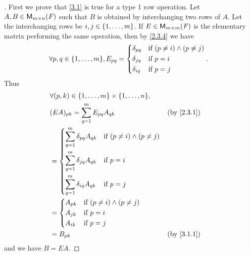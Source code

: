 \begin{proof}[]
	First we prove that \cref{3.1} is true for a type 1 row operation.
	Let \(A, B \in \ms\) such that \(B\) is obtained by interchanging two rows of \(A\).
	Let the interchanging rows be \(i, j \in \left\lbrace1, \dots, m\right\rbrace\).
	If \(E \in \ms[m][m][\F]\) is the elementary matrix performing the same operation, then by \cref{2.3.4} we have
	\[
		\forall p, q \in \set{1, \dots, m}, E_{p q} = \begin{dcases}
			\delta_{p q} & \text{if } (p \neq i) \land (p \neq j) \\
			\delta_{j q} & \text{if } p = i                       \\
			\delta_{i q} & \text{if } p = j
		\end{dcases}.
	\]
	Thus
	\begin{align*}
		 & \forall (p, k) \in \set{1, \dots, m} \times \set{1, \dots, n},                                  \\
		 & (EA)_{p k} = \sum_{q = 1}^m E_{p q} A_{q k}                                     &  & \by{2.3.1} \\
		 & = \begin{dcases}
			     \sum_{q = 1}^m \delta_{p q} A_{q k} & \text{if } (p \neq i) \land (p \neq j) \\
			     \sum_{q = 1}^m \delta_{j q} A_{q k} & \text{if } p = i                       \\
			     \sum_{q = 1}^m \delta_{i q} A_{q k} & \text{if } p = j
		     \end{dcases}                  \\
		 & = \begin{dcases}
			     A_{p k} & \text{if } (p \neq i) \land (p \neq j) \\
			     A_{j k} & \text{if } p = i                       \\
			     A_{i k} & \text{if } p = j
		     \end{dcases}                                              \\
		 & = B_{p k}                                                                       &  & \by{3.1.1}
	\end{align*}
	and we have \(B = EA\).


\end{proof}
